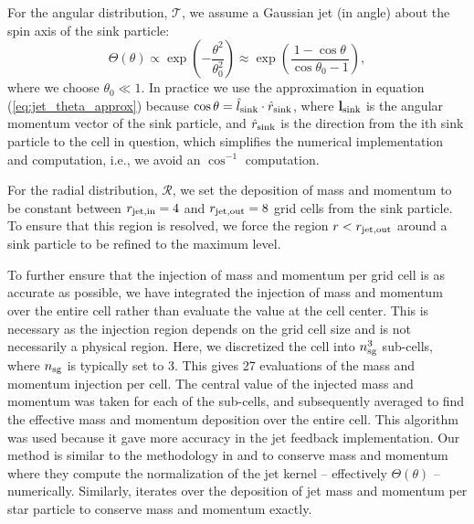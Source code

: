 \documentclass[../dissertation.tex]{subfiles}
\begin{document}
For the angular distribution, $\mathcal{T}$, we assume a Gaussian jet (in angle) about the spin axis of the sink particle:
\begin{equation}
\Theta(\theta) \propto \exp\left(-\frac{\theta^2}{\theta_0^2}\right) \approx  \exp\left(\frac{1-\cos\theta}{\cos\theta_0 - 1}\right),
\label{eq:jet_theta_approx}
\end{equation}
where we choose $\theta_0 \ll 1$. %
In practice we use the approximation in equation (\ref{eq:jet_theta_approx}) because $\cos\theta = \hat{l}_{\rm sink} \cdot \hat{r}_{\rm sink} $, where ${\bf l}_{\rm sink}$ is the angular momentum vector of the sink particle, and $\hat{r}_{\rm sink}$ is the direction from the ith sink particle to the cell in question, which simplifies the numerical implementation and computation, i.e., we avoid an $\cos^{-1}$ computation.

For the radial distribution, $\mathcal{R}$, we set the deposition of mass and momentum to be constant between $r_{\rm jet, in} = 4$ and $r_{\rm jet, out} = 8$ grid cells from the sink particle.
To ensure that this region is resolved, we force the region $r<r_{\rm jet,out}$ around a sink particle to be  refined to the maximum level.

To further ensure that the injection of mass and momentum per grid cell is as accurate as possible, we have integrated the injection of mass and momentum over the entire cell rather than evaluate the value at the cell center.  This is necessary as the injection region depends on the grid cell size and is not necessarily a physical region.
Here, we discretized the cell into $n_{\rm sg}^3$ sub-cells, where $n_{\rm sg}$ is typically set to 3. This gives 27 evaluations of the mass and momentum injection per cell.
The central value of the injected mass and momentum was taken for each of the sub-cells, and subsequently averaged to find the effective mass and momentum deposition over the entire cell.
This algorithm was used because it gave more accuracy in the jet feedback implementation.
Our method is similar to the methodology in \citet{2011ApJ...740..107C} and \citet{2014MNRAS.439.3420M} to conserve mass and momentum where they compute the normalization of the jet kernel -- effectively $\Theta(\theta)$ -- numerically.
Similarly, \citet{2014ApJ...790..128F} iterates over the deposition of jet mass and momentum per star particle to conserve mass and momentum exactly.
\end{document}
